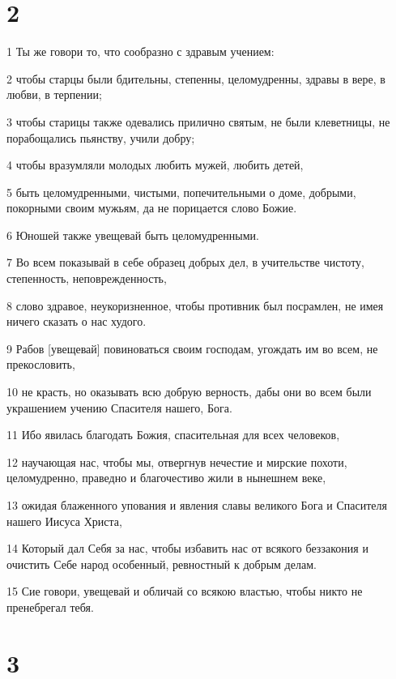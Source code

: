 \chapter{2}

\par 1 Ты же говори то, что сообразно с здравым учением:
\par 2 чтобы старцы были бдительны, степенны, целомудренны, здравы в вере, в любви, в терпении;
\par 3 чтобы старицы также одевались прилично святым, не были клеветницы, не порабощались пьянству, учили добру;
\par 4 чтобы вразумляли молодых любить мужей, любить детей,
\par 5 быть целомудренными, чистыми, попечительными о доме, добрыми, покорными своим мужьям, да не порицается слово Божие.
\par 6 Юношей также увещевай быть целомудренными.
\par 7 Во всем показывай в себе образец добрых дел, в учительстве чистоту, степенность, неповрежденность,
\par 8 слово здравое, неукоризненное, чтобы противник был посрамлен, не имея ничего сказать о нас худого.
\par 9 Рабов [увещевай] повиноваться своим господам, угождать им во всем, не прекословить,
\par 10 не красть, но оказывать всю добрую верность, дабы они во всем были украшением учению Спасителя нашего, Бога.
\par 11 Ибо явилась благодать Божия, спасительная для всех человеков,
\par 12 научающая нас, чтобы мы, отвергнув нечестие и мирские похоти, целомудренно, праведно и благочестиво жили в нынешнем веке,
\par 13 ожидая блаженного упования и явления славы великого Бога и Спасителя нашего Иисуса Христа,
\par 14 Который дал Себя за нас, чтобы избавить нас от всякого беззакония и очистить Себе народ особенный, ревностный к добрым делам.
\par 15 Сие говори, увещевай и обличай со всякою властью, чтобы никто не пренебрегал тебя.

\chapter{3}

